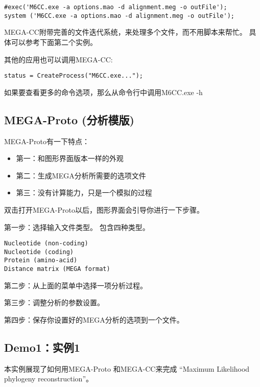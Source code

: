 \documentclass{ctexart}
\begin{document}
\lstset{frame=trBL,frameround=fttt,breaklines=true,language=Perl}
\begin{lstlisting}
#exec('M6CC.exe -a options.mao -d alignment.meg -o outFile'); 
system ('M6CC.exe -a options.mao -d alignment.meg -o outFile');
\end{lstlisting}
MEGA-CC附带完善的文件迭代系统，来处理多个文件，而不用脚本来帮忙。
具体可以参考下面第二个实例。

其他的应用也可以调用MEGA-CC:

\lstset{frame=trBL,frameround=fttt,breaklines=true,language=Perl}
\begin{lstlisting}
status = CreateProcess("M6CC.exe...");
\end{lstlisting}
如果要查看更多的命令选项，那么从命令行中调用M6CC.exe -h
\subsection{MEGA-Proto (分析模版)}
\label{sec-3-5}

MEGA-Proto有一下特点：
\begin{itemize}
\item 第一：和图形界面版本一样的外观
\item 第二：生成MEGA分析所需要的选项文件
\item 第三：没有计算能力，只是一个模拟的过程
\end{itemize}
双击打开MEGA-Proto以后，图形界面会引导你进行一下步骤。

第一步：选择输入文件类型。
包含四种类型。

\lstset{frame=trBL,frameround=fttt,breaklines=true,language=Perl}
\begin{lstlisting}
Nucleotide (non-coding)
Nucleotide (coding)
Protein (amino-acid)
Distance matrix (MEGA format)
\end{lstlisting}

第二步：从上面的菜单中选择一项分析过程。

第三步：调整分析的参数设置。

第四步：保存你设置好的MEGA分析的选项到一个文件。
\subsection{Demo1：实例1}
\label{sec-3-6}

本实例展现了如何用MEGA-Proto 和MEGA-CC来完成
“Maximum Likelihood phylogeny reconstruction”。
\end{document}
